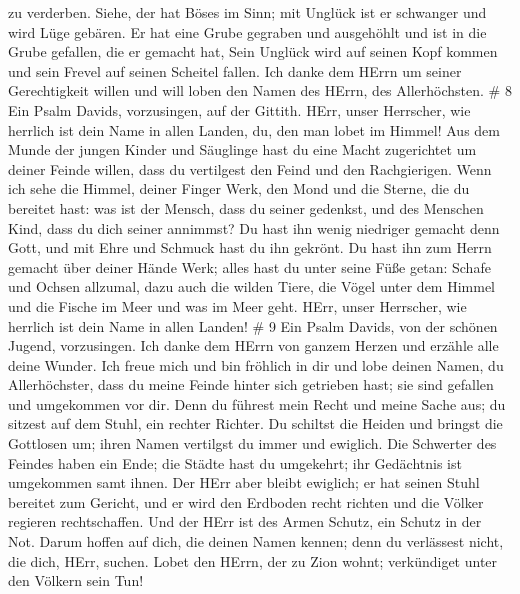 zu verderben.  Siehe, der hat Böses im Sinn; mit Unglück
ist er schwanger und wird Lüge gebären.  Er hat eine Grube
gegraben und ausgehöhlt und ist in die Grube gefallen, die er gemacht
hat,  Sein Unglück wird auf seinen Kopf kommen und sein
Frevel auf seinen Scheitel fallen.  Ich danke dem HErrn um
seiner Gerechtigkeit willen und will loben den Namen des HErrn, des
Allerhöchsten. \# 8  Ein Psalm Davids, vorzusingen, auf der
Gittith.  HErr, unser Herrscher, wie herrlich ist dein Name
in allen Landen, du, den man lobet im Himmel!  Aus dem Munde
der jungen Kinder und Säuglinge hast du eine Macht zugerichtet um deiner
Feinde willen, dass du vertilgest den Feind und den Rachgierigen.
 Wenn ich sehe die Himmel, deiner Finger Werk, den Mond und
die Sterne, die du bereitet hast:  was ist der Mensch, dass
du seiner gedenkst, und des Menschen Kind, dass du dich seiner annimmst?
 Du hast ihn wenig niedriger gemacht denn Gott, und mit Ehre
und Schmuck hast du ihn gekrönt.  Du hast ihn zum Herrn
gemacht über deiner Hände Werk; alles hast du unter seine Füße getan:
 Schafe und Ochsen allzumal, dazu auch die wilden Tiere,
 die Vögel unter dem Himmel und die Fische im Meer und was
im Meer geht.  HErr, unser Herrscher, wie herrlich ist dein
Name in allen Landen! \# 9  Ein Psalm Davids, von der
schönen Jugend, vorzusingen.  Ich danke dem HErrn von ganzem
Herzen und erzähle alle deine Wunder.  Ich freue mich und
bin fröhlich in dir und lobe deinen Namen, du Allerhöchster,
 dass du meine Feinde hinter sich getrieben hast; sie sind
gefallen und umgekommen vor dir.  Denn du führest mein Recht
und meine Sache aus; du sitzest auf dem Stuhl, ein rechter Richter.
 Du schiltst die Heiden und bringst die Gottlosen um; ihren
Namen vertilgst du immer und ewiglich.  Die Schwerter des
Feindes haben ein Ende; die Städte hast du umgekehrt; ihr Gedächtnis ist
umgekommen samt ihnen.  Der HErr aber bleibt ewiglich; er
hat seinen Stuhl bereitet zum Gericht,  und er wird den
Erdboden recht richten und die Völker regieren rechtschaffen.
 Und der HErr ist des Armen Schutz, ein Schutz in der Not.
 Darum hoffen auf dich, die deinen Namen kennen; denn du
verlässest nicht, die dich, HErr, suchen.  Lobet den HErrn,
der zu Zion wohnt; verkündiget unter den Völkern sein Tun! 
